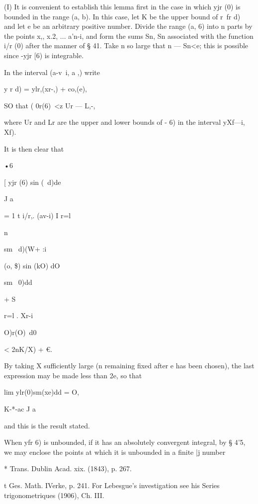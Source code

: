 (I) It is convenient to establish this lemma first in the case in
which yjr (0) is bounded in the range (a, b). In this case, let K be
the upper bound of r\ fr d)\, and let e be an arbitrary positive
number. Divide the range (a, 6) into n parts by the points x,, x.2,
... a'n-i, and form the sums Sn, Sn associated with the function i/r
(0) after the manner of § 41. Take n so large that n — Sn<e; this is
possible since -yjr [6) is integrable.

In the interval (a-v\ i, a ,) write

y r d) = ylr,(xr-,) + co,(e),

SO that ( 0r(6)\ <z Ur — L,-,

where Ur and Lr are the upper and lower bounds of - 6) in the interval
yXf—i, Xf).

It is then clear that

•6



[ yjr (6) sin (\ d)de

J a



= 1 t i/r,. (av-i) I r=l

n



sm \ d)(W+ :i



(o, \$) sin (kO) dO



sm \ 0)dd



+ S

r=l . Xr-i



O)r(O)\ d0



< 2nK/X) + €.

By taking X sufficiently large (n remaining fixed after e has been
chosen), the last expression may be made less than 2e, so that



lim ylr(0)sm(xe)dd = O,

K-*-ac J a

and this is the result stated.

When yfr 6) is unbounded, if it has an absolutely convergent integral,
by § 4'5, we may enclose the points at which it is unbounded in a
finite |j number

* Trans. Dublin Acad. xix. (1843), p. 267.

t Ges. Math. IVerke, p. 241. For Lebesgue's investigation see his
Series trigonometriques (1906), Ch. III.

